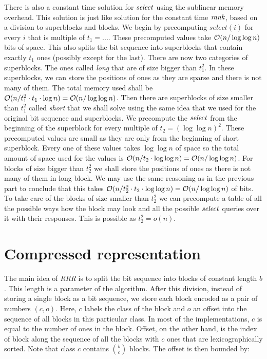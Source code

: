 There is also a constant time solution for $\mathit{select}$ using the sublinear memory overhead.
This solution is just like solution for the constant time $\mathit{rank}$, based on a division
to superblocks and blocks. We begin by precomputing $select(i)$ for every $i$ that is
multiple of $t_1=...$. These precomputed values take $\mathcal{O}(n/\log\log n)$ bits of space.
This also splits the bit sequence into superblocks that contain exactly $t_1$ ones (possibly
except for the last). There are
now two categories of superblocks. The ones called \textit{long} that are of size bigger
than $t_1^2$. In these superblocks, we can store the positions of ones as they are sparse
and there is not many of them. The total memory used shall be $\mathcal{O}(n/t_1^2\cdot t_1\cdot
\log n) = \mathcal{O}(n/\log\log n)$. Then there are superblocks of size smaller than $t_1^2$ called
\textit{short} that we shall solve using the same idea that we used for the original bit sequence
and superblocks. We precompute the $\mathit{select}$ from the beginning of the superblock for every
multiple of $t_2=(\log\log n)^2$. These precomputed values are small as they are only from the
beginning of short superblock. Every one of these values takes $\log\log n$ of space so the
total amount of space used for the values is $\mathcal{O}(n/t_2\cdot \log\log n) = \mathcal{O}(n/\log\log n)$.
For blocks of size bigger than $t_2^2$ we shall store the positions of ones as there is not
many of them in long block. We may use the same reasoning as in the previous part to conclude
that this takes $\mathcal{O}(n/t_2^2\cdot t_2\cdot \log\log n) = \mathcal{O}(n/\log\log n)$ of bits. To
take care of the blocks of size smaller than $t_2^2$ we can precompute a table of all the
possible ways how the block may look and all the possible $\mathit{select}$ queries over it with
their responses. This is possible as $t_2^2 = o(n)$.

\section{Compressed representation}
\label{section:compressed_bv}

The main idea of \textit{RRR} is to split the bit sequence into blocks of constant length
$b$. This length is a parameter of the algorithm. After this division, instead
of storing a single block as a bit sequence, we store each block encoded as a pair
of numbers $(c, o)$. Here, $c$ labels the class of the block and $o$ an offset into
the sequence of all blocks in this particular class. In most of the implementations,
$c$ is equal to the number of ones in the block. Offset, on the other hand, is the
index of block along the sequence of all the blocks with $c$ ones that are lexicographically
sorted. Note that class $c$ contains ${b\choose c}$ blocks. The offset is then bounded by:

